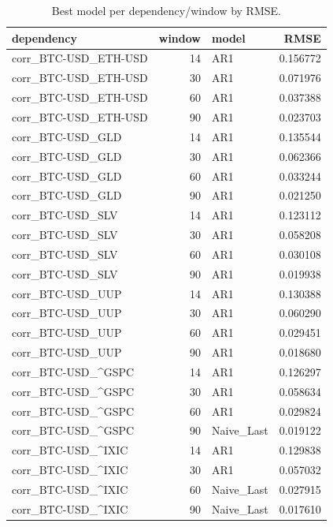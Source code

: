 \begin{table}
\caption{Best model per dependency/window by RMSE.}
\label{tab:best_models}
\begin{tabular}{lrlr}
\toprule
dependency & window & model & RMSE \\
\midrule
corr_BTC-USD_ETH-USD & 14 & AR1 & 0.156772 \\
corr_BTC-USD_ETH-USD & 30 & AR1 & 0.071976 \\
corr_BTC-USD_ETH-USD & 60 & AR1 & 0.037388 \\
corr_BTC-USD_ETH-USD & 90 & AR1 & 0.023703 \\
corr_BTC-USD_GLD & 14 & AR1 & 0.135544 \\
corr_BTC-USD_GLD & 30 & AR1 & 0.062366 \\
corr_BTC-USD_GLD & 60 & AR1 & 0.033244 \\
corr_BTC-USD_GLD & 90 & AR1 & 0.021250 \\
corr_BTC-USD_SLV & 14 & AR1 & 0.123112 \\
corr_BTC-USD_SLV & 30 & AR1 & 0.058208 \\
corr_BTC-USD_SLV & 60 & AR1 & 0.030108 \\
corr_BTC-USD_SLV & 90 & AR1 & 0.019938 \\
corr_BTC-USD_UUP & 14 & AR1 & 0.130388 \\
corr_BTC-USD_UUP & 30 & AR1 & 0.060290 \\
corr_BTC-USD_UUP & 60 & AR1 & 0.029451 \\
corr_BTC-USD_UUP & 90 & AR1 & 0.018680 \\
corr_BTC-USD_^GSPC & 14 & AR1 & 0.126297 \\
corr_BTC-USD_^GSPC & 30 & AR1 & 0.058634 \\
corr_BTC-USD_^GSPC & 60 & AR1 & 0.029824 \\
corr_BTC-USD_^GSPC & 90 & Naive_Last & 0.019122 \\
corr_BTC-USD_^IXIC & 14 & AR1 & 0.129838 \\
corr_BTC-USD_^IXIC & 30 & AR1 & 0.057032 \\
corr_BTC-USD_^IXIC & 60 & Naive_Last & 0.027915 \\
corr_BTC-USD_^IXIC & 90 & Naive_Last & 0.017610 \\
\bottomrule
\end{tabular}
\end{table}
